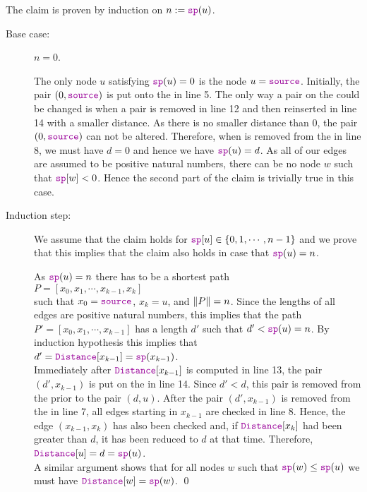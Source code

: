 \proof The claim is proven by induction on $n := \mytt{sp}(u)$.
\begin{description}
\item[Base case:] $n = 0$.

  The only node $u$ satisfying $\mytt{sp}(u) = 0$ is the node $u = \mytt{source}$.
  Initially, the pair $(0, \mytt{source})$ is put onto the  in line 5.
  The only way a pair on the  could be changed is when a pair is removed in line 12 and then
  reinserted in line 14 with a smaller distance.  As there is no smaller distance than $0$, the pair
  $(0, \mytt{source})$ can not be altered.  Therefore, when  is removed from the
   in line 8, we must have $d = 0$ and hence we have $\mytt{sp}(u) = d$.
  As all of our edges are assumed to be positive natural numbers, there can be no node $w$ such that
  $\mytt{sp}[w] < 0$. Hence the second part of the claim is trivially true in this case.
\item[Induction step:]  We assume that the claim holds for $\mytt{sp}[u] \in \{0,1,\cdots,n-1\}$
  and we prove that this implies that the claim also holds in case that $\mytt{sp}(u) = n$.

  As $\mytt{sp}(u) = n$ there has to be a shortest path
  \\[0.2cm]
  \hspace*{1.3cm}
  $P = [x_0, x_1, \cdots, x_{k-1}, x_k]$
  \\[0.2cm]
  such that $x_0 = \mytt{source}$, $x_k = u$, and $\|P\| = n$.  Since the lengths of all edges are
  positive natural numbers, this implies that the path $P' = [x_0,x_1, \cdots, x_{k-1}]$ has a length $d'$ such
  that $d' < \mytt{sp}(u) = n$.  By induction hypothesis this implies that
  \\[0.2cm]
  \hspace*{1.3cm}
  $d' = \mytt{Distance}[x_{k-1}] = \mytt{sp}(x_{k-1})$.
  \\[0.2cm]
  Immediately after $\mytt{Distance}[x_{k-1}]$ is computed in line 13, the pair
  $(d', x_{k-1})$ is put on the  in line 14.  Since $d' < d$, this pair is removed from the
   prior to the pair $(d, u)$.  After the pair $(d',x_{k-1})$ is removed from the
   in line 7, all edges starting in $x_{k-1}$ are checked in line 8.
  Hence, the edge $(x_{k-1}, x_k)$ has also been checked and, if $\mytt{Distance}[x_k]$ had been greater than
  $d$, it has been reduced to $d$ at that time.  Therefore,
  \\[0.2cm]
  \hspace*{1.3cm}
  $\mytt{Distance}[u] = d = \mytt{sp}(u)$.
  \\[0.2cm]
  A similar argument shows that for all nodes $w$ such that  
  $\mytt{sp}(w) \leq \mytt{sp}(u)$ we must have $\mytt{Distance}[w] = \mytt{sp}(w)$.  \qed
\end{description}

